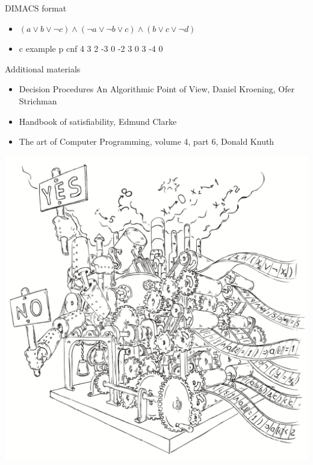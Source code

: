 \documentclass[mathserif]{beamer}
\begin{document}
\begin{frame}{DIMACS format}
\begin{itemize}
\item $(a \vee b \vee \lnot c) \wedge (\lnot a \vee \lnot b \vee c) \wedge (b \vee c \vee \lnot d)$
\item c example\newline
p cnf 4 3 2 -3 0 -2 3 0 3 -4 0\newline
\end{itemize}
\end{frame}

\begin{frame}{Additional materials}
\begin{itemize}
\item Decision Procedures An Algorithmic Point of View, Daniel Kroening, Ofer Strichman
\item Handbook of satisfiability, Edmund Clarke
\item The art of Computer Programming, volume 4, part 6, Donald Knuth
\end{itemize}
\end{frame}

\begin{frame}
\includegraphics[scale=0.5]{../decision-procedure.png}
\end{frame}
\end{document}
